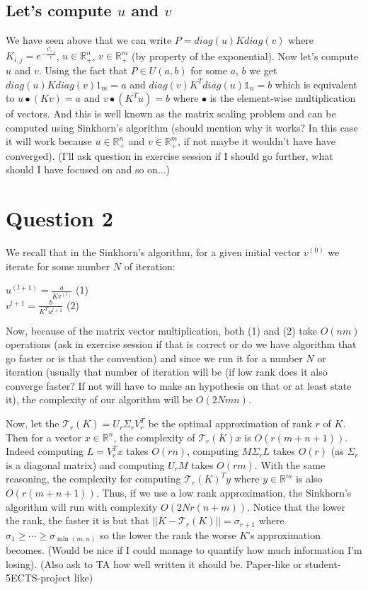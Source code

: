 \documentclass[a4paper]{article}
\theoremstyle{definition}
\theoremstyle{remark}
\newcommand{\R}{\mathbb{R}}
\newcommand{\T}{\mathcal{T}}
\begin{document}
\subsection*{Let's compute $u$ and $v$}

We have seen above that we can write $P=diag(u)Kdiag(v)$ where $K_{i,j}=e^{-\frac{C_{i,j}}{\epsilon}}$, $u\in \R^n_+$, $v\in \R^m_+$ (by property of the exponential). Now let's compute $u$ and $v$. Using the fact that $P\in U(a,b)$ for some $a$, $b$ we get $diag(u)Kdiag(v){1}_m=a$ and $diag(v)K^Tdiag(u)\mathbb{1}_n=b$ which is equivalent to $u\bullet (Kv)=a$ and $v\bullet(K^Tu)=b$ where $\bullet$ is the element-wise multiplication of vectors. And this is well known as the matrix scaling problem and can be computed using Sinkhorn's algorithm (should mention why it works? In this case it will work because $u\in \R^n_+$ and $v\in \R^m_+$, if not maybe it wouldn't have have converged). 
(I'll ask question in exercise session if I should go further, what should I have focused on and so on...)

\section*{Question 2}

We recall that in the Sinkhorn's algorithm, for a given initial vector $v^{(0)}$ we iterate for some number $N$ of iteration:

$u^{(l+1)}=\frac{a}{Kv^{(l)}}$ (1) \\
$v^{l+1}=\frac{b}{K^Tu^{l+1}}$  (2)

Now, because of the matrix vector multiplication, both (1) and (2) take $O(nm)$ operations (ask in exercise session if that is correct or do we have algorithm that go faster or is that the convention) and since we run it for a number $N$ or iteration (usually that number of iteration will be 
(if low rank does it also converge faster? If not will have to make an hypothesis on that or at least state it), the complexity of our algorithm will be $O(2Nmn)$.

Now, let the $\T_r(K)=U_r\Sigma_rV^T_r$ be the optimal approximation of rank $r$ of $K$. Then for a vector $x \in \R^n$, the complexity of $\T_r(K)x$ is $O(r(m+n+1))$. Indeed computing $L=V^T_rx$ takes $O(rn)$, computing $M\Sigma_rL$ takes $O(r)$ (as $\Sigma_r$ is a diagonal matrix) and computing $U_rM$ takes $O(rm)$. With the same reasoning, the complexity for computing $\T_r(K)^Ty$ where $y\in \R^m$ is also $O(r(m+n+1))$. Thus, if we use a low rank approximation, the Sinkhorn's algorithm will run with complexity $O(2Nr(n+m))$. Notice that the lower the rank, the faster it is but that $||K-\T_r(K)||=\sigma_{r+1}$ where $\sigma_1\geq \cdots \geq \sigma_{\min(m,n)}$ so the lower the rank the worse $K$'s approximation becomes. (Would be nice if I could manage to quantify how much information I'm losing). 
(Also ask to TA how well written it should be. Paper-like or student-5ECTS-project like)
\end{document}
